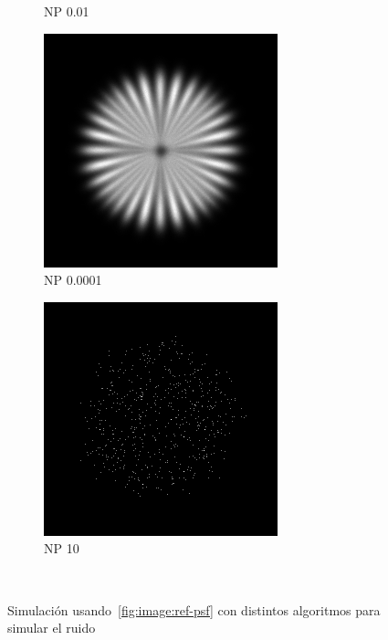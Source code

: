 \documentclass{./packages/optica-article}
\begin{document}
\begin{figure}[hbp]
\begin{center}
\begin{subfigure}[t]{0.25\textwidth}
			\caption{NP 0.01}\label{fig:sim:np0.01}
		\end{subfigure}
		\hfill
		\begin{subfigure}[t]{0.25\textwidth}\centering
			\centering
			\includegraphics[width=\textwidth]{Simulation deconvolution/ref_np_0.0001}
			\caption{NP 0.0001}
		\end{subfigure}
		\hfill
		\begin{subfigure}[t]{0.25\textwidth}\centering
			\centering
			\includegraphics[width=\textwidth]{Simulation deconvolution/ref_np_10}
			\caption{NP 10}
		\end{subfigure}
		\hfill\,
		\caption{Simulación usando~\ref{fig:image:ref-psf} con distintos algoritmos para simular el ruido}\label{fig:convolutions}
	\end{center}
\end{figure}
\end{document}
